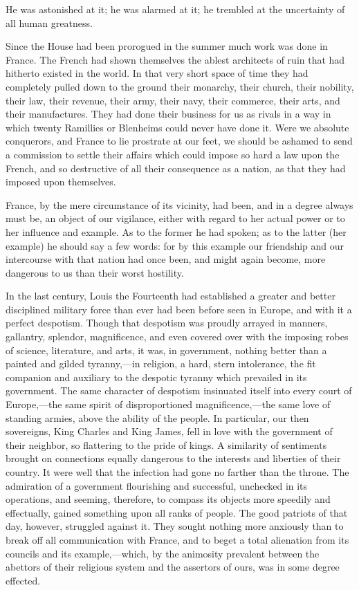 He was astonished at it; he was alarmed at it; he trembled at the uncertainty of all human greatness.

Since the House had been prorogued in the summer much work was done in France. The French had shown themselves the ablest architects of ruin that had hitherto existed in the world. In that very short space of time they had completely pulled down to the ground their monarchy, their church, their nobility, their law, their revenue, their army, their navy, their commerce, their arts, and their manufactures. They had done their business for us as rivals in a way in which twenty Ramillies or Blenheims could never have done it. Were we absolute conquerors, and France to lie prostrate at our feet, we should be ashamed to send a commission to settle their affairs which could impose so hard a law upon the French, and so destructive of all their consequence as a nation, as that they had imposed upon themselves.

France, by the mere circumstance of its vicinity, had been, and in a degree always must be, an object of our vigilance, either with regard to her actual power or to her influence and example. As to the former he had spoken; as to the latter (her example) he should say a few words: for by this example our friendship and our intercourse with that nation had once been, and might again become, more dangerous to us than their worst hostility.

In the last century, Louis the Fourteenth had established a greater and better disciplined military force than ever had been before seen in Europe, and with it a perfect despotism. Though that despotism was proudly arrayed in manners, gallantry, splendor, magnificence, and even covered over with the imposing robes of science, literature, and arts, it was, in government, nothing better than a painted and gilded tyranny,—in religion, a hard, stern intolerance, the fit companion and auxiliary to the despotic tyranny which prevailed in its government. The same character of despotism insinuated itself into every court of Europe,—the same spirit of disproportioned magnificence,—the same love of standing armies, above the ability of the people. In particular, our then sovereigns, King Charles and King James, fell in love with the government of their neighbor, so flattering to the pride of kings. A similarity of sentiments brought on connections equally dangerous to the interests and liberties of their country. It were well that the infection had gone no farther than the throne. The admiration of a government flourishing and successful, unchecked in its operations, and seeming, therefore, to compass its objects more speedily and effectually, gained something upon all ranks of people. The good patriots of that day, however, struggled against it. They sought nothing more anxiously than to break off all communication with France, and to beget a total alienation from its councils and its example,—which, by the animosity prevalent between the abettors of their religious system and the assertors of ours, was in some degree effected.

